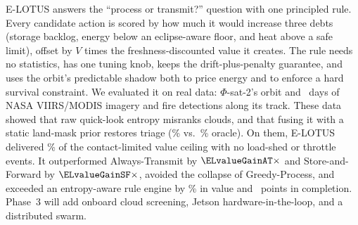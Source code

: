 E-LOTUS answers the ``process or transmit?'' question with one principled rule. Every candidate action is scored by how much it would increase three debts (storage backlog, energy below an eclipse-aware floor, and heat above a safe limit), offset by $V$ times the freshness-discounted value it creates. The rule needs no statistics, has one tuning knob, keeps the drift-plus-penalty guarantee, and uses the orbit's predictable shadow both to price energy and to enforce a hard survival constraint. We evaluated it on real data: $\Phi$-sat-2's orbit and \Days\ days of NASA VIIRS/MODIS imagery and fire detections along its track. These data showed that raw quick-look entropy misranks clouds, and that fusing it with a static land-mask prior restores triage (\CapEL\% vs.\ \CapOracle\% oracle). On them, E-LOTUS delivered \ELceil\% of the contact-limited value ceiling with no load-shed or throttle events. It outperformed Always-Transmit by $\ELvalueGainAT\times$ and Store-and-Forward by $\ELvalueGainSF\times$, avoided the collapse of Greedy-Process, and exceeded an entropy-aware rule engine by \ELvalueGainRB\% in value and \ELcomplDelta\ points in completion. Phase~3 will add onboard cloud screening, Jetson hardware-in-the-loop, and a distributed swarm.
